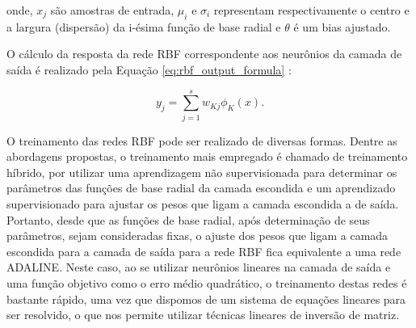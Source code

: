 onde, $x_j$ são amostras de entrada, $\mu_i$ e $\sigma_i$ representam respectivamente o centro e a largura (dispersão) da i-ésima função de base radial e $\theta$ é um bias ajustado.

O cálculo da resposta da rede RBF correspondente aos neurônios da camada de saída é realizado pela Equação \ref{eq:rbf_output_formula} \label{symbol:respostasaidaRBF}:

\begin{equation}
\label{eq:rbf_output_formula}
y_j = \sum_{j=1}^{s} w_{Kj} \phi_K(x)   .
\end{equation}

O treinamento das redes RBF pode ser realizado de diversas formas. Dentre as abordagens propostas, o treinamento mais empregado é chamado de treinamento híbrido, por utilizar uma aprendizagem não supervisionada para determinar os parâmetros das funções de base radial da camada escondida e um aprendizado supervisionado para ajustar os pesos que ligam a camada escondida a de saída. Portanto, desde que as funções de base radial, após determinação de seus parâmetros, sejam consideradas fixas, o ajuste dos pesos que ligam a camada escondida para a camada de saída para a rede RBF fica equivalente a uma rede ADALINE. Neste caso, ao se utilizar neurônios lineares na camada de saída e uma função objetivo como o erro médio quadrático, o treinamento destas redes é bastante rápido, uma vez que dispomos de um sistema de equações lineares para ser resolvido, o que nos permite utilizar técnicas lineares de inversão de matriz.

